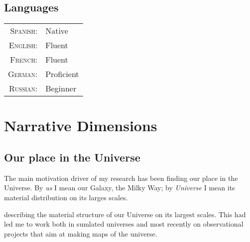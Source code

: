 \documentclass[a4paper,10pt]{article} %
\begin{document}


\subsection{Languages}

\begin{tabular}{rl}
\textsc{Spanish:} & Native\\
\textsc{English:} & Fluent\\
\textsc{French:} & Fluent \\
\textsc{German:} & Proficient \\
\textsc{Russian:} & Beginner \\
\end{tabular}

\color{red}
\section{Narrative Dimensions}
\color{black}

\subsection{Our place in the Universe}

The main motivation driver of my research has been finding our place
in the Universe. By \emph{us} I mean our Galaxy, the Milky Way; by
\emph{Universe} I mean its material distribution on its larges scales.

describing the material
structure of our Universe on its largest scales. 
This had led me to work both in sumlated universes and most recently
on observational projects that aim at making maps of the universe.
\end{document}
